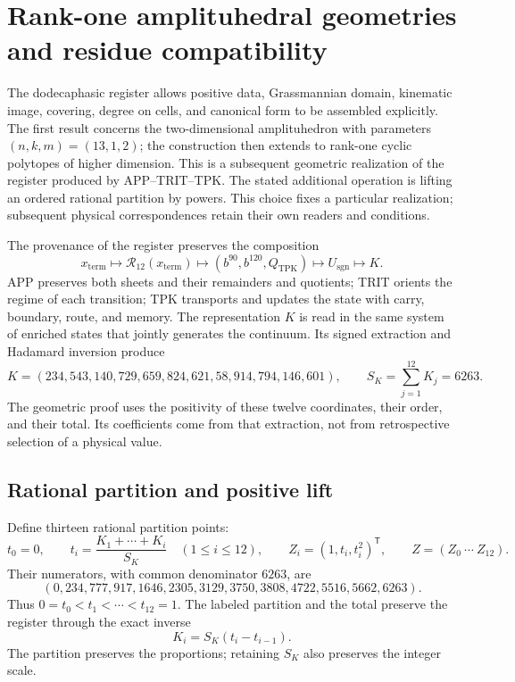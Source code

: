 \section{Rank-one amplituhedral geometries and residue compatibility}
\label{sec:k-poligono-amplituhedral}

The dodecaphasic register allows positive data, Grassmannian domain,
kinematic image, covering, degree on cells, and canonical form to be
assembled explicitly. The first result concerns the two-dimensional
amplituhedron with parameters \((n,k,m)=(13,1,2)\); the construction
then extends to rank-one cyclic polytopes of higher dimension.
This is a subsequent geometric realization of the register produced
by APP--TRIT--TPK. The stated additional operation is lifting an ordered
rational partition by powers. This choice fixes a particular realization;
subsequent physical correspondences retain their own readers and conditions.

The provenance of the register preserves the composition
\[
 x_{\mathrm{term}}\longmapsto\mathcal R_{12}(x_{\mathrm{term}})
 \longmapsto(b^{90},b^{120},Q_{\mathrm{TPK}})
 \longmapsto U_{\mathrm{sgn}}\longmapsto K.
\]
APP preserves both sheets and their remainders and quotients; TRIT
orients the regime of each transition; TPK transports and updates
the state with carry, boundary, route, and memory. The representation
\(K\) is read in the same system of enriched states that jointly
generates the continuum. Its signed extraction and Hadamard inversion
produce
\begin{equation}
 K=(234,543,140,729,659,824,621,58,914,794,146,601),
 \qquad S_K=\sum_{j=1}^{12}K_j=6263.
 \label{eq:polygon-K}
\end{equation}
The geometric proof uses the positivity of these twelve coordinates,
their order, and their total. Its coefficients come from that extraction,
not from retrospective selection of a physical value.

\subsection{Rational partition and positive lift}

Define thirteen rational partition points:
\begin{equation}
 t_0=0,\qquad t_i=\frac{K_1+\cdots+K_i}{S_K}\quad(1\leq i\leq12),
 \qquad Z_i=(1,t_i,t_i^2)^\mathsf T,\qquad Z=(Z_0\ \cdots\ Z_{12}).
 \label{eq:polygon-Z}
\end{equation}
Their numerators, with common denominator \(6263\), are
\[
 (0,234,777,917,1646,2305,3129,3750,3808,4722,5516,5662,6263).
\]
Thus \(0=t_0<t_1<\cdots<t_{12}=1\). The labeled partition and
the total preserve the register through the exact inverse
\begin{equation}
 K_i=S_K(t_i-t_{i-1}).
 \label{eq:polygon-recover-K}
\end{equation}
The partition preserves the proportions; retaining \(S_K\) also
preserves the integer scale.

